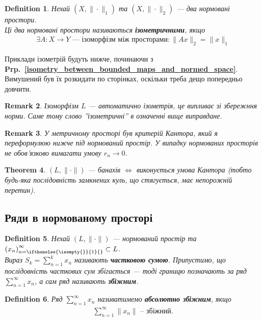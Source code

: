 \documentclass[a4paper, 10pt]{article}
\theoremstyle{theoremdd}
\newtheorem{theorem}{Theorem}[subsection]
\theoremstyle{theoremdd}
\newtheorem{definition}[theorem]{Definition}
\theoremstyle{theoremdd}
\theoremstyle{theoremdd}
\theoremstyle{theoremdd}
\theoremstyle{theoremdd}
\newtheorem{remark}[theorem]{Remark}
\theoremstyle{theoremdd}
\theoremstyle{theoremdd}
\newcommand\prpref[1]{\textbf{Prp.~\ref{#1}}}
\newcommand{\sequence}[2][]{\left({#2}\right)_{n=\ifthenelse{\isempty{#1}}{1}{#1}}^{\infty}}
\begin{document}
\begin{definition}
Нехай $(X,\|\cdot\|_1)$ та $(X,\|\cdot\|_2)$ --- два нормовані простори.\\
Ці два нормовані простори називаються \textbf{ізометричними}, якщо
\begin{align*}
\exists A \colon X \to Y \text{ --- ізоморфізм між просторами}: \|Ax\|_2 = \|x\|_1
\end{align*}
\end{definition}
\noindent
Приклади ізометрій будуть нижче, починаючи з \prpref{isometry_between_bounded_maps_and_normed_space}. Вимушений був їх розкидати по сторінках, оскільки треба дещо попередньо довчити.

\begin{remark}
Ізоморфізм $L$ --- автоматично ізометрія, це випливає зі збережння норми. Саме тому слово ''\textit{ізометричні}'' в означенні вище виправдане.
\end{remark}

\begin{remark}
У метричному просторі був критерій Кантора, який я переформулюю нижче під нормований простір. У випадку нормованих просторів не обов'язково вимагати умову $r_n \to 0$.
\end{remark}

\begin{theorem}
$(L,\|\cdot \|)$ --- банахів $\iff$ виконується умова Кантора (\textit{тобто будь-яка послідовність замкнених куль, що стягується, має непорожній перетин}).
\end{theorem}

\subsection{Ряди в нормованому просторі}
\begin{definition}
Нехай $(L, \|\cdot\|)$ --- нормований простір та $\sequence{x_n} \subset L$.\\
Вираз $S_k = \displaystyle\sum_{n=1}^k x_n$ називають \textbf{частковою сумою}. Припустимо, що послідовність часткових сум збігається --- тоді границю позначають за ряд $\displaystyle\sum_{n=1}^\infty x_n$, а сам ряд називають \textbf{збіжним}.
\end{definition}

\begin{definition}
Ряд $\displaystyle\sum_{n=1}^\infty x_n$ називатимемо \textbf{абсолютно збіжним}, якщо
\begin{align*}
\sum_{n=1}^\infty \| x_n \| \text{ -- збіжний.}
\end{align*} 
\end{definition}
\end{document}
